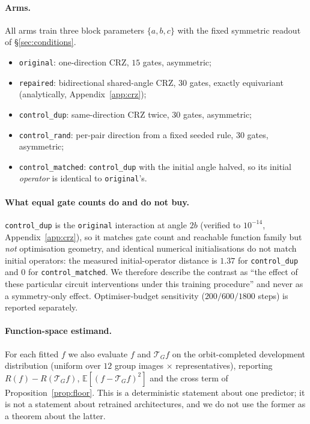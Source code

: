 \documentclass{neurips_2024}
\newcommand{\Tg}{\mathcal{T}_G}
\begin{document}
\paragraph{Arms.} All arms train three block parameters $\{a,b,c\}$ with the fixed
symmetric readout of \S\ref{sec:conditions}.
\begin{itemize}[leftmargin=1.4em,itemsep=1pt,topsep=1pt]
  \item \texttt{original}: one-direction CRZ, $15$ gates, asymmetric;
  \item \texttt{repaired}: bidirectional shared-angle CRZ, $30$ gates, exactly
        equivariant (analytically, Appendix~\ref{app:crz});
  \item \texttt{control\_dup}: same-direction CRZ twice, $30$ gates, asymmetric;
  \item \texttt{control\_rand}: per-pair direction from a fixed seeded rule, $30$ gates,
        asymmetric;
  \item \texttt{control\_matched}: \texttt{control\_dup} with the initial angle halved, so
        its initial \emph{operator} is identical to \texttt{original}'s.
\end{itemize}

\paragraph{What equal gate counts do and do not buy.} \texttt{control\_dup} is the
\texttt{original} interaction at angle $2b$ (verified to $10^{-14}$,
Appendix~\ref{app:crz}), so it matches gate count and reachable function family but
\emph{not} optimisation geometry, and identical numerical initialisations do not match
initial operators: the measured initial-operator distance is $1.37$ for
\texttt{control\_dup} and $0$ for \texttt{control\_matched}. We therefore describe the
contrast as ``the effect of these particular circuit interventions under this training
procedure'' and never as a symmetry-only effect. Optimiser-budget sensitivity
($200/600/1800$ steps) is reported separately.

\paragraph{Function-space estimand.} For each fitted $f$ we also evaluate $f$ and $\Tg f$
on the orbit-completed development distribution (uniform over $12$ group images
$\times$ representatives), reporting $R(f)-R(\Tg f)$, $\mathbb{E}[(f-\Tg f)^2]$ and the
cross term of Proposition~\ref{prop:floor}. This is a deterministic statement about one
predictor; it is not a statement about retrained architectures, and we do not use the
former as a theorem about the latter.
\end{document}
